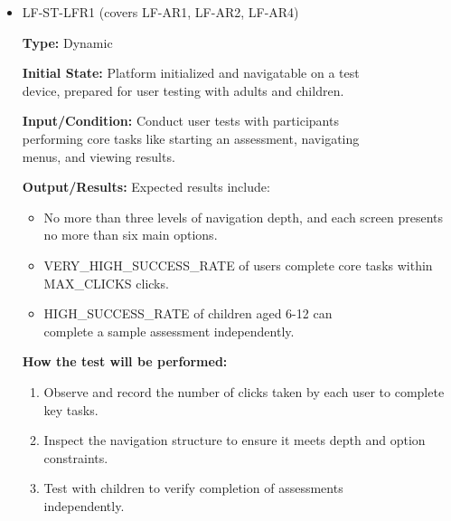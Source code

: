 \documentclass[12pt, titlepage]{article}
\begin{document}
\begin{itemize} 
  \item LF-ST-LFR1 (covers LF-AR1, LF-AR2, LF-AR4) 
  \begin{mdframed}[linewidth=0.5mm] 
    \textbf{Type:} Dynamic \par 
    \textbf{Initial State:} Platform initialized and navigatable on a test \\device, prepared for user testing with adults and children. \par 
    \textbf{Input/Condition:} Conduct user tests with participants \\performing core tasks like starting an assessment, navigating \\menus, and viewing results. \par 
    \textbf{Output/Results:} Expected results include: 
    \begin{itemize} 
      \item No more than three levels of navigation depth, and each screen presents no more than six main options. 
      \item VERY\_HIGH\_SUCCESS\_RATE of users complete core tasks within MAX\_CLICKS clicks. 
      \item HIGH\_SUCCESS\_RATE of children aged 6-12 can \\complete a sample assessment independently. 
    \end{itemize} \par \textbf{How the test will be performed:} 
    \begin{enumerate}[noitemsep] 
      \item Observe and record the number of clicks taken by each user to complete key tasks. 
      \item Inspect the navigation structure to ensure it meets depth and option constraints. 
      \item Test with children to verify completion of assessments \\independently. 
    \end{enumerate} 
  \end{mdframed}


\end{itemize}
\end{document}
